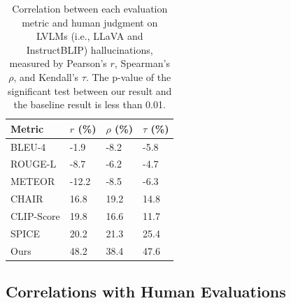 \begin{table}[]
    \centering \small
    \begin{tabular}{llll}
    \toprule
    \bf Metric & $r$ (\%) & $\rho$ (\%) & $\tau$ (\%) \\ \midrule
        BLEU-4 & -1.9& -8.2 & -5.8 \\ 
        ROUGE-L & -8.7&-6.2 &  -4.7\\ 
        METEOR & -12.2&-8.5 & -6.3\\ 
        CHAIR & 16.8&19.2 & 14.8\\ 
        CLIP-Score &19.8 & 16.6  & 11.7 \\  
SPICE& 20.2 &21.3 &25.4\\ 
\midrule

        Ours & 48.2&  38.4& 47.6\\ 

    \bottomrule
    \end{tabular}
    \caption{Correlation between each evaluation metric and human judgment on LVLMs \textcolor[rgb]{0,0,0}{(i.e., LLaVA and InstructBLIP)}
    hallucinations, measured by Pearson's $r$, Spearman’s $\rho$, and Kendall’s $\tau$. 
    \textcolor[rgb]{0,0,0}{The p-value of the significant test between our result and the baseline result is less than 0.01.}
    } 
    \label{tab:correlation}
\end{table}


\subsection{Correlations with Human Evaluations}



